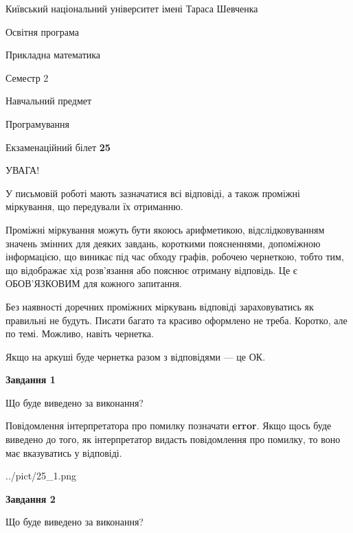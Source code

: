 \documentclass[12pt, ukrainian]{article}
\begin{document}
{{\begin {small}\par
{ \center  Київський національний університет імені Тараса Шевченка \par}
{\parbox {5 cm}{Освітня програма \hfill}{\parbox {7 cm}{Прикладна математика \hfill}}\parbox {6 cm}{\hfill Семестр 2}}\par
{\parbox {5 cm} {Навчальний предмет \hfill}\parbox {7 cm}{Програмування \hfill}\parbox {6cm}{\hfill}\par}\vspace{-7pt} \end{small}}{\center Екзаменаційний білет \No \textbf
{ 25 }\par}}
{
\begin {large}
УВАГА!

У письмовій роботі мають зазначатися всі відповіді, а також проміжні міркування, що передували їх отриманню.

Проміжні міркування можуть бути якоюсь арифметикою, відслідковуванням зна\-чень змінних для деяких завдань,
короткими поясненнями, допоміжною інформацією, що виникає під час обходу графів, робочею чернеткою,
тобто тим, що відображає хід розв’язання або пояснює отриману відповідь.
Це є ОБОВ’ЯЗКОВИМ для кожного запитання.

Без наявності доречних проміжних міркувань відповіді зараховуватись як правиль\-ні не будуть.
Писати багато та красиво оформлено не треба. Коротко, але по темі. Можли\-во, навіть чернетка.

Якщо на аркуші буде чернетка разом з відповідями --- це ОК.

\newpage

{\begin {center}\textbf{Завдання 1}\end {center}}\par
Що буде виведено за виконання?

Повідомлення інтерпретатора про помилку позначати \textbf{error}.
Якщо щось буде виведено до того, як інтерпретатор видасть повідомлення про помилку, 
то воно має вказуватись у відповіді. \par


\begin{center}
	{../pict/25_1.png}
\end{center}
\newpage

{\begin {center}\textbf{Завдання 2}\end {center}}\par
Що буде виведено за виконання?


\end{large}}
\end{document}

